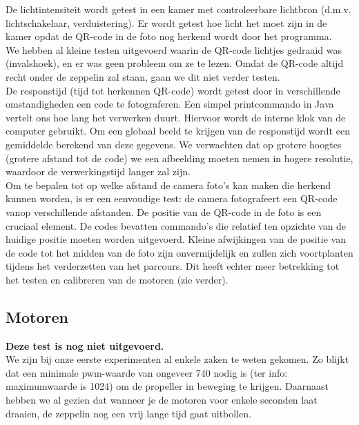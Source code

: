 \documentclass[eind]{penoverslag}
\begin{document}
De lichtintensiteit wordt getest in een kamer met controleerbare lichtbron (d.m.v. lichtschakelaar, verduistering). Er wordt getest hoe licht het moet zijn in de kamer opdat de QR-code in de foto nog herkend wordt door het programma. \\

We hebben al kleine testen uitgevoerd waarin de QR-code lichtjes gedraaid was (invalshoek), en er was geen probleem om ze te lezen. Omdat de QR-code altijd recht onder de zeppelin zal staan, gaan we dit niet verder testen. \\

De responstijd (tijd tot herkennen QR-code) wordt getest door in verschillende omstandigheden een code te fotograferen. Een simpel printcommando in Java vertelt ons hoe lang het verwerken duurt. Hiervoor wordt de interne klok van de computer gebruikt. Om een globaal beeld te krijgen van de responstijd wordt een gemiddelde berekend van deze gegevens. We verwachten dat op grotere hoogtes (grotere afstand tot de code) we een afbeelding moeten nemen in hogere resolutie, waardoor de verwerkingstijd langer zal zijn. \\

Om te bepalen tot op welke afstand de camera foto's kan maken die herkend kunnen worden, is er een eenvoudige test: de camera fotografeert een QR-code vanop verschillende afstanden. 
De positie van de QR-code in de foto is een cruciaal element. De codes bevatten commando’s die relatief ten opzichte van de huidige positie moeten worden uitgevoerd. Kleine afwijkingen van de positie van de code tot het midden van de foto zijn onvermijdelijk en zullen zich voortplanten tijdens het verderzetten van het parcours. Dit heeft echter meer betrekking tot het testen en calibreren van de motoren (zie verder). \\


\subsection{Motoren}
\textbf{Deze test is nog niet uitgevoerd.} \\

We zijn bij onze eerste experimenten al enkele zaken te weten gekomen. Zo blijkt dat een minimale pwm-waarde van ongeveer 740 nodig is (ter info: maximumwaarde is 1024) om de propeller in beweging te krijgen. Daarnaast hebben we al gezien dat wanneer je de motoren voor enkele seconden laat draaien, de zeppelin nog een vrij lange tijd gaat uitbollen. \\
\end{document}
